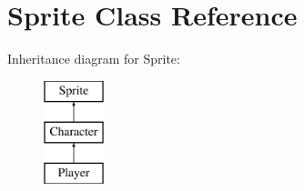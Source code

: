 \hypertarget{classSprite}{\section{Sprite Class Reference}
\label{classSprite}
}
Inheritance diagram for Sprite\+:\begin{figure}[H]
\begin{center}
\leavevmode
\includegraphics[height=3.000000cm]{classSprite}
\end{center}
\end{figure}
